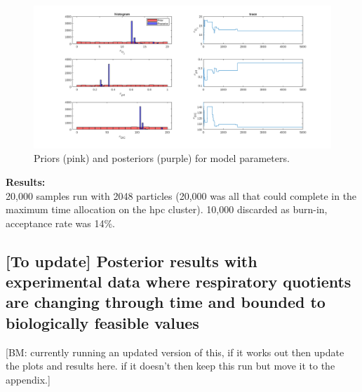 \documentclass{ruthesis}
\begin{document}
\begin{figure}
	\centerline{\includegraphics[width=1.3\textwidth]{images_microalgae/plots_test/model_parameters3}}
	\caption[.]{Priors (pink) and posteriors (purple) for model parameters.}
	\label{fig:micro_exp_test_parameters_model3}
\end{figure}


\textbf{Results:}\\
20,000 samples run with 2048 particles (20,000 was all that could complete in the maximum time allocation on the hpc cluster). 10,000 discarded as burn-in, acceptance rate was 14\%.




\FloatBarrier
\subsection{[To update] Posterior results with experimental data where respiratory quotients are changing through time and bounded to biologically feasible values}

[BM: currently running an updated version of this, if it works out then update the plots and results here. if it doesn't then keep this run but move it to the appendix.]
\end{document}
